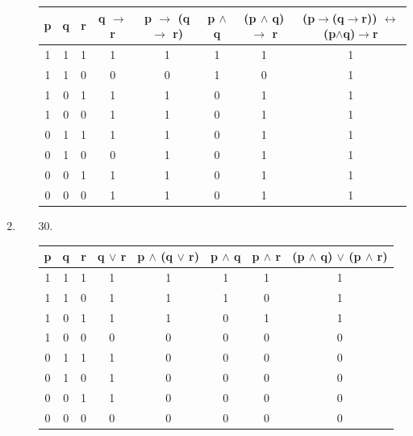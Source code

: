 \documentclass[12pt]{article}
\begin{document}
\begin{enumerate}[label = \alph*)]
\begin{itemize}
                \begin{tabular}{ccc|c|c|c|c|c}
                    p & q & r & q $\rightarrow$ r & p $\rightarrow$
                            (q $\rightarrow$ r) & p $\wedge$ q & (p $\wedge$ q)
                            $\rightarrow$ r & (p$\rightarrow$(q$\rightarrow$r))
                            $\leftrightarrow$ (p$\wedge$q)$\rightarrow$r\\
                    \hline
                    1 & 1 & 1 & 1 & 1 & 1 & 1 & 1 \\
                    1 & 1 & 0 & 0 & 0 & 1 & 0 & 1 \\
                    1 & 0 & 1 & 1 & 1 & 0 & 1 & 1 \\
                    1 & 0 & 0 & 1 & 1 & 0 & 1 & 1 \\
                    0 & 1 & 1 & 1 & 1 & 0 & 1 & 1 \\
                    0 & 1 & 0 & 0 & 1 & 0 & 1 & 1 \\
                    0 & 0 & 1 & 1 & 1 & 0 & 1 & 1 \\
                    0 & 0 & 0 & 1 & 1 & 0 & 1 & 1 \\
                \end{tabular}
        \end{itemize}
    \item
        \begin{itemize}
            \item [30.]
                \vspace{2em}
                \begin{tabular}{ccc|c|c|c|c|c}
                    p & q & r & q $\vee$ r & p $\wedge$ (q $\vee$ r) & 
                            p $\wedge$ q & p $\wedge$ r & (p $\wedge$ q)
                            $\vee$ (p $\wedge$ r) \\
                    \hline
                    1 & 1 & 1 & 1 & 1 & 1 & 1 & 1 \\
                    1 & 1 & 0 & 1 & 1 & 1 & 0 & 1 \\
                    1 & 0 & 1 & 1 & 1 & 0 & 1 & 1 \\
                    1 & 0 & 0 & 0 & 0 & 0 & 0 & 0 \\
                    0 & 1 & 1 & 1 & 0 & 0 & 0 & 0 \\
                    0 & 1 & 0 & 1 & 0 & 0 & 0 & 0 \\
                    0 & 0 & 1 & 1 & 0 & 0 & 0 & 0 \\
                    0 & 0 & 0 & 0 & 0 & 0 & 0 & 0 \\

\end{tabular}
\end{itemize}
\end{enumerate}
\end{document}
